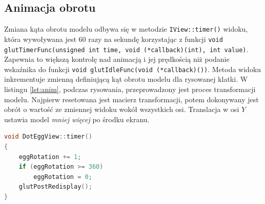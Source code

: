 \subsection{Animacja obrotu}
Zmiana kąta obrotu modelu odbywa się w metodzie \lstinline{IView::timer()} widoku, która wywoływana jest 60 razy na sekundę korzystając z funkcji \lstinline{void glutTimerFunc(unsigned int time, void (*callback)(int), int value)}. Zapewnia to większą kontrolę nad animacją i jej prędkością niż podanie wskaźnika do funkcji \lstinline{void glutIdleFunc(void (*callback)())}.
Metoda widoku inkrementuje zmienną definiującą kąt obrotu modelu dla rysowanej klatki. W listingu \ref{lst:anim}, podczas rysowania, przeprowadzony jest proces transformacji modelu. Najpierw resetowana jest macierz transformacji, potem dokonywany jest obrót o wartość ze zmiennej widoku wokół wszystkich osi. Translacja w osi $Y$ ustawia model \textit{mniej więcej} po środku ekranu.
\begin{lstlisting}[language=C++, caption=Ustawianie zmiennej kątu obrotu i przerysowanie klatki.]
void DotEggView::timer()
{
    eggRotation += 1;
    if (eggRotation >= 360)
        eggRotation = 0;
    glutPostRedisplay();
}
\end{lstlisting}
